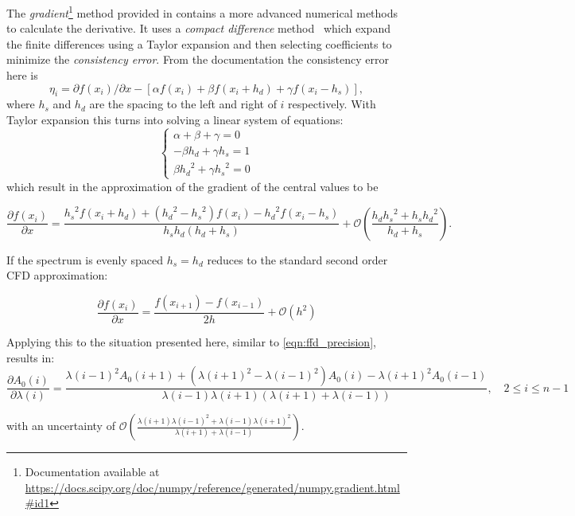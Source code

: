 The \emph{gradient}\footnote{Documentation available at \href{https://docs.scipy.org/doc/numpy/reference/generated/numpy.gradient.html\#id1 }{https://docs.scipy.org/doc/numpy/reference/generated/numpy.gradient.html\#id1}}  method provided in \numpy{} contains a more advanced numerical methods to calculate the derivative.
It uses a \textit{compact difference} method~\citep{quarteroni_numerical_2000} which expand the finite differences using a Taylor expansion and then selecting coefficients to minimize the \textit{consistency error}.
From the \numpy{} documentation the consistency error here is \[\eta_i = \partial{f(x_i)}/\partial{x} -  [\alpha f(x_i) + \beta f(x_i +h_d) + \gamma f(x_i - h_s)],\] where \(h_s\) and \(h_d\) are the spacing to the left and right of \(i\) respectively.
With Taylor expansion this turns into solving a linear system of equations:
\[\begin{cases}
\alpha + \beta + \gamma = 0\\
-\beta {h_d} + \gamma {h_s} = 1\\
\beta {h_{d}}^{2} + \gamma {h_{s}}^{2} = 0
\end{cases}
\]
which result in the approximation of the gradient of the central values to be

\[\frac{\partial{f(x_i)}}{\partial{x}} = \frac{{h_{s}}^{2}f\left(x_{i} + {h_{d}}\right) + \left({h_{d}}^{2} - {h_{s}}^{2}\right)f\left(x_{i}\right) - {h_{d}}^{2}f\left(x_{i}-{h_{s}}\right)} {{h_{s}}{h_{d}}\left({h_{d}} + {h_{s}}\right)} + \mathcal{O}\left(\frac{h_{d}{h_{s}}^{2} + {h_{s}}{h_{d}}^{2}}{{h_{d}} + {h_{s}}}\right) \label{full_compact_difference}.\]

If the spectrum is evenly spaced ${h_{s}}={h_{d}}$  reduces to the standard second order {CFD} approximation:

\[\frac{\partial{f(x_i)}}{\partial{x}} = \frac{f\left(x_{i+1}\right) - f\left(x_{i-1}\right)}{2h} + \mathcal{O}\left({h}^{2}\right)\]


Applying this to the situation presented here, similar to \cref{eqn:ffd_precision}, results in:
\[\frac{\partial {A}_{0}(i)}{\partial\lambda(i)} = \frac{{\lambda(i-1)}^{2} {A}_{0}(i+1) + ({\lambda(i+1)}^{2}-{\lambda(i-1)}^{2}) {A}_{0}(i) - {\lambda(i+1)}^{2} {A}_{0}(i-1)} {\lambda(i-1)\lambda(i+1)(\lambda(i+1) + \lambda(i-1))}, \hspace{1em} 2 \leq i \leq n-1\]

with an uncertainty of \(\mathcal{O}\left(\frac{\lambda(i+1){\lambda(i-1)}^{2} + \lambda(i-1){\lambda(i+1)}^{2}}{\lambda(i+1) + \lambda(i-1)}\right)\).


